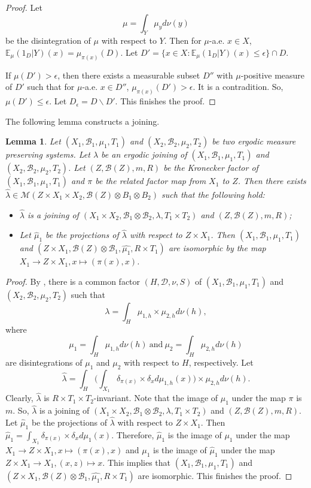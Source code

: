 \documentclass[reqno,12pt]{amsart}
\newtheorem{lemma}[thm]{Lemma}
\def \E {\mathbb E}
\def\B {\mathcal B}
\def \ep {\epsilon}
\numberwithin{equation}{section}
\begin{document}
\begin{proof}
	Let $$\mu=\int_{Y}\mu_{y}d\nu(y)$$ be the disintegration of $\mu$ with respect to $Y$. Then for $\mu$-a.e. $x\in X$, $\E_{\mu}(1_D|Y)(x)=\mu_{\pi(x)}(D)$. Let $D'=\{x\in X:\E_{\mu}(1_D|Y)(x)\le \ep\}\cap D$.

	If $\mu(D')>\ep$, then there exists a measurable subset $D''$ with $\mu$-positive measure of $D'$ such that for $\mu$-a.e. $x\in D''$, $\mu_{\pi(x)}(D')> \ep$. It is a contradition. So, $\mu(D')\le\ep$. Let $D_{\ep}=D\backslash {D'}$. This finishes the proof.
\end{proof}
The following lemma constructs a joining.
\begin{lemma}\label{lem3}
	Let $(X_1,\B_1,\mu_1,T_1)$ and $(X_2,\B_2,\mu_2,T_2)$ be two ergodic measure preserving systems. Let $\lambda$ be an ergodic joining of $(X_1,\B_1,\mu_1,T_1)$ and $(X_2,\B_2,\mu_2,T_2)$. Let $(Z,\B(Z),m,R)$ be the Kronecker factor of $(X_1,\B_1,\mu_1,T_1)$ and $\pi$ be the related factor map from $X_1$ to $Z$. Then there exists $\hat{\lambda}\in \mathcal{M}(Z\times X_1\times X_2,\B(Z)\otimes B_1\otimes B_2)$ such that the following hold:
	\begin{itemize}
		\item $\hat{\lambda}$ is a joining of $(X_1\times X_2,\B_1\otimes \B_2,\lambda,T_1\times T_2)$ and $(Z,\B(Z),m,R)$;
		\item Let $\hat{\mu}_1$ be the projections of $\hat{\lambda}$ with respect to $Z\times X_1$. Then $(X_1,\B_1,\mu_1,T_1)$ and $(Z\times X_1,\B(Z)\otimes \B_1,\hat{\mu_1},R\times T_1)$ are isomorphic by the map $X_1\to Z\times X_1,x\mapsto (\pi(x),x)$.
	\end{itemize}
\end{lemma}
\begin{proof}
   	By \cite[Theorem 6.8]{G-book}, there is a common factor $(H,\mathcal{D},\nu,S)$ of $(X_1,\B_1,\mu_1,T_1)$ and $(X_2,\B_2,\mu_2,T_2)$ such that $$\lambda=\int_{H}\mu_{1,h}\times \mu_{2,h}d\nu(h),$$ where $$\mu_1=\int_{H}\mu_{1,h}d\nu(h)\ \text{and}\ \mu_2=\int_{H}\mu_{2,h}d\nu(h)$$ are disintegrations of $\mu_1$ and $\mu_2$ with respect to $H$, respectively. Let
   $$\hat{\lambda}=\int_{H}\Big(\int_{X_1}\delta_{\pi(x)}\times \delta_{x}d\mu_{1,h}(x)\Big)\times \mu_{2,h}d\nu(h).$$
    Clearly, $\hat{\lambda}$ is $R\times T_1\times T_2$-invariant. Note that the image of $\mu_1$ under the map $\pi$ is $m$. So, $\hat{\lambda}$ is a joining of $(X_1\times X_2,\B_1\otimes \B_2,\lambda,T_1\times T_2)$ and $(Z,\B(Z),m,R)$. Let $\hat{\mu}_1$ be the projections of $\hat{\lambda}$ with respect to $Z\times X_1$. Then $\hat{\mu}_1=\int_{X_1}\delta_{\pi(x)}\times \delta_{x}d\mu_{1}(x)$. Therefore, $\hat{\mu}_1$ is the image of $\mu_1$ under the map $X_1\to Z\times X_1,x\mapsto (\pi(x),x)$ and ${\mu}_1$ is the image of $\hat{\mu}_1$ under the map $Z\times X_1\to X_1,(x,z)\mapsto x$. This implies that  $(X_1,\B_1,\mu_1,T_1)$ and $(Z\times X_1,\B(Z)\otimes \B_1,\hat{\mu_1},R\times T_1)$ are isomorphic. This finishes the proof.
\end{proof}
\end{document}
